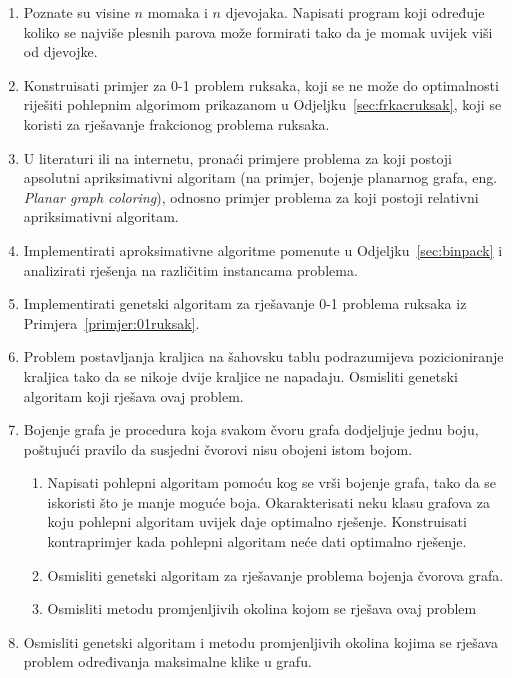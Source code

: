 \documentclass[b5paper, utf8, 11pt, colorlinks]{book}
\theoremstyle{definition}
\begin{document}
\begin{enumerate}
	\item Poznate su visine $n$ momaka i $n$ djevojaka. Napisati program koji
	određuje koliko se najviše plesnih parova može formirati tako da je momak uvijek
	viši od djevojke.
	\item Konstruisati primjer za 0-1 problem ruksaka, koji se ne može do optimalnosti riješiti pohlepnim algorimom prikazanom u Odjeljku~\ref{sec:frkacruksak}, koji se koristi za rješavanje frakcionog problema ruksaka.
	
	\item   U literaturi ili na internetu, pronaći primjere problema za koji postoji apsolutni apriksimativni algoritam (na primjer, bojenje planarnog grafa, eng. \emph{Planar graph coloring}), odnosno primjer problema za koji postoji relativni apriksimativni algoritam.
	
	\item Implementirati aproksimativne algoritme pomenute u Odjeljku~\ref{sec:binpack} i analizirati rješenja na različitim instancama problema.
	
	\item Implementirati genetski algoritam za rješavanje 0-1 problema ruksaka iz Primjera~\ref{primjer:01ruksak}.
	
	\item Problem postavljanja kraljica na šahovsku tablu podrazumijeva pozicioniranje kraljica tako da se nikoje dvije kraljice ne napadaju. Osmisliti genetski algoritam koji rješava ovaj problem.
		\item Bojenje grafa je procedura koja svakom čvoru grafa dodjeljuje jednu boju, poštujući pravilo da susjedni čvorovi nisu obojeni istom bojom. 
		\begin{enumerate}
			\item 	Napisati pohlepni algoritam pomoću kog se vrši bojenje grafa, tako da se iskoristi što je manje moguće boja.  Okarakterisati neku klasu grafova za koju  pohlepni algoritam uvijek daje optimalno rješenje. Konstruisati kontraprimjer kada pohlepni algoritam neće dati optimalno rješenje.
	\item Osmisliti genetski algoritam za rješavanje problema bojenja čvorova grafa.
	\item Osmisliti metodu promjenljivih okolina kojom se rješava ovaj problem
		\end{enumerate}
	
	\item Osmisliti genetski algoritam i metodu promjenljivih okolina kojima se rješava problem određivanja maksimalne klike u grafu.
	

\end{enumerate}
\end{document}
